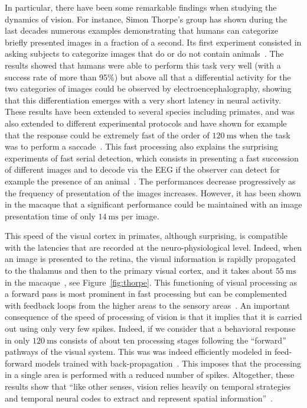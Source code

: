 \documentclass[brainsci, %
               review,submit,pdftex,moreauthors%
               ]{Definitions/mdpi}
\newcommand{\ms}{\si{\milli\second}}%
\begin{document}
In particular, there have been some remarkable findings when studying the dynamics of vision. For instance, Simon Thorpe's group has shown during the last decades numerous examples demonstrating that humans can categorize briefly presented images in a fraction of a second. Its first experiment consisted in asking subjects to categorize images that do or do not contain animals~\citep{thorpe_speed_1996}. The results showed that humans were able to perform this task very well (with a success rate of more than 95\%) but above all that a differential activity for the two categories of images could be observed by electroencephalography, showing that this differentiation emerges with a very short latency in neural activity. These results have been extended to several species including primates, and was also extended to different experimental protocols and have shown for example that the response could be extremely fast of the order of $120~\ms$ when the task was to perform a saccade~\citep{kirchner_ultra-rapid_2006}. This fast processing also explains the surprising experiments of fast serial detection, which consists in presenting a fast succession of different images and to decode via the EEG if the observer can detect for example the presence of an animal~\citep{keysers_speed_2001}. The performances decrease progressively as the frequency of presentation of the images increases. However, it has been shown in the macaque that a significant performance could be maintained with an image presentation time of only $14~\ms$ per image.

This speed of the visual cortex in primates, although surprising, is  compatible with the latencies that are recorded at the neuro-physiological level. Indeed, when an image is presented to the retina, the visual information is rapidly propagated to the thalamus and then to the primary visual cortex, and it takes about $55~\ms$ in the macaque~\citep{nowak_timing_1997}, see Figure~\ref{fig:thorpe}. This functioning of visual processing as a forward pass is most prominent in fast processing but can be complemented with feedback loops from the higher areas to the sensory areas~\citep{lamme_distinct_2000}.
%
An important consequence of the speed of processing of vision is that it implies that it is carried out using only very few spikes. Indeed, if we consider that a behavioral response in only $120~\ms$ consists of about ten processing stages following the ``forward'' pathways of the visual system. This was was indeed efficiently modeled in feed-forward models trained with back-propagation~\citep{serre_feedforward_2007,jeremie_ultrafast_2022}. This imposes that the processing in a single area is performed with a reduced number of spikes. Altogether, these results show that ``like other senses, vision relies heavily on temporal strategies and temporal neural codes to extract and represent spatial information''~\citep{rucci_temporal_2018}.
\end{document}
